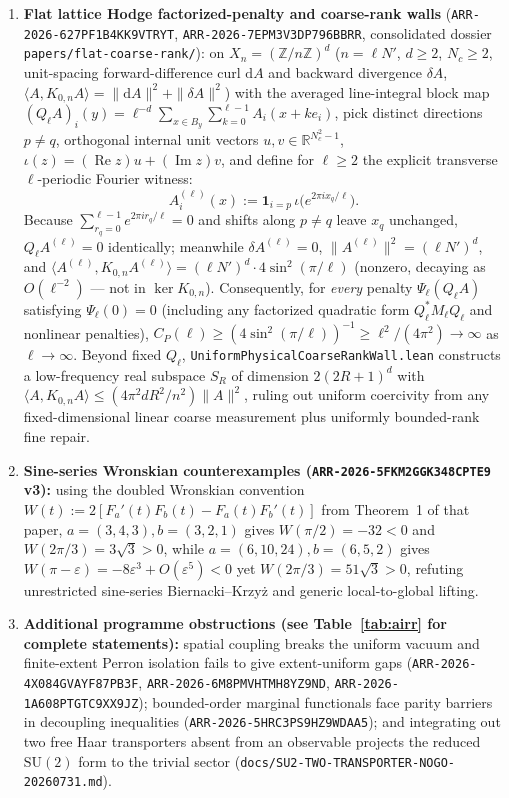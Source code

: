 \documentclass[11pt]{article}
\newcommand{\Z}{\mathbb{Z}}
\newcommand{\R}{\mathbb{R}}
\begin{document}
\begin{enumerate}
  \item \textbf{Flat lattice Hodge factorized-penalty and coarse-rank walls}
  (\texttt{ARR-2026-627PF1B4KK9VTRYT}, \texttt{ARR-2026-7EPM3V3DP796BBRR}, consolidated
  dossier \texttt{papers/flat-coarse-rank/}): on $X_n = (\Z/n\Z)^d$ ($n = \ell N'$,
  $d \ge 2$, $N_c \ge 2$, unit-spacing forward-difference curl $\mathrm{d}A$ and backward
  divergence $\delta A$, $\langle A, K_{0,n} A\rangle = \|\mathrm{d}A\|^2 + \|\delta A\|^2$)
  with the averaged line-integral block map
  $(Q_\ell A)_i(y) = \ell^{-d}\sum_{x \in B_y}\sum_{k=0}^{\ell-1} A_i(x + k e_i)$, pick
  distinct directions $p \neq q$, orthogonal internal unit vectors $u,v \in \R^{N_c^2-1}$,
  $\iota(z) = (\operatorname{Re} z) u + (\operatorname{Im} z) v$, and define for $\ell \ge 2$
  the explicit transverse $\ell$-periodic Fourier witness:
  \[
    A^{(\ell)}_i(x) := \mathbf{1}_{i=p}\,\iota\!\bigl(e^{2\pi i x_q / \ell}\bigr).
  \]
  Because $\sum_{r_q=0}^{\ell-1} e^{2\pi i r_q / \ell} = 0$ and shifts along $p \neq q$
  leave $x_q$ unchanged, $Q_\ell A^{(\ell)} = 0$ identically; meanwhile
  $\delta A^{(\ell)} = 0$, $\|A^{(\ell)}\|^2 = (\ell N')^d$, and
  $\langle A^{(\ell)}, K_{0,n} A^{(\ell)}\rangle = (\ell N')^d \cdot 4\sin^2(\pi/\ell)$
  (nonzero, decaying as $O(\ell^{-2})$ — not in $\ker K_{0,n}$). Consequently, for
  \emph{every} penalty $\Psi_\ell(Q_\ell A)$ satisfying $\Psi_\ell(0) = 0$ (including any
  factorized quadratic form $Q_\ell^* M_\ell Q_\ell$ and nonlinear penalties),
  $C_P(\ell) \ge (4\sin^2(\pi/\ell))^{-1} \ge \ell^2/(4\pi^2) \to \infty$ as
  $\ell \to \infty$. Beyond fixed $Q_\ell$, \texttt{UniformPhysicalCoarseRankWall.lean}
  constructs a low-frequency real subspace $S_R$ of dimension $2(2R+1)^d$ with
  $\langle A, K_{0,n} A\rangle \le (4\pi^2 d R^2/n^2)\|A\|^2$, ruling out uniform coercivity
  from any fixed-dimensional linear coarse measurement plus uniformly bounded-rank fine repair.

  \item \textbf{Sine-series Wronskian counterexamples (\texttt{ARR-2026-5FKM2GGK348CPTE9} v3):}
  using the doubled Wronskian convention $W(t) := 2[F_a'(t)F_b(t) - F_a(t)F_b'(t)]$ from
  Theorem~1 of that paper, $a=(3,4,3), b=(3,2,1)$ gives $W(\pi/2) = -32 < 0$ and
  $W(2\pi/3) = 3\sqrt{3} > 0$, while $a=(6,10,24), b=(6,5,2)$ gives
  $W(\pi-\varepsilon) = -8\varepsilon^3 + O(\varepsilon^5) < 0$ yet
  $W(2\pi/3) = 51\sqrt{3} > 0$, refuting unrestricted sine-series Biernacki--Krzy\.z and
  generic local-to-global lifting.

  \item \textbf{Additional programme obstructions (see Table~\ref{tab:airr} for complete statements):}
  spatial coupling breaks the uniform vacuum and finite-extent Perron isolation fails to
  give extent-uniform gaps (\texttt{ARR-2026-4X084GVAYF87PB3F},
  \texttt{ARR-2026-6M8PMVHTMH8YZ9ND}, \texttt{ARR-2026-1A608PTGTC9XX9JZ}); bounded-order
  marginal functionals face parity barriers in decoupling inequalities
  (\texttt{ARR-2026-5HRC3PS9HZ9WDAA5}); and integrating out two free Haar transporters absent
  from an observable projects the reduced $\mathrm{SU}(2)$ form to the trivial sector
  (\texttt{docs/SU2-TWO-TRANSPORTER-NOGO-20260731.md}).
\end{enumerate}
\end{document}
